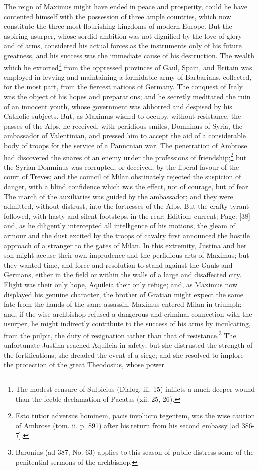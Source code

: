 The reign of Maximus might have ended in peace and prosperity, could he have contented himself with the possession of three ample countries, which now constitute the three most flourishing kingdoms of modern Europe. But the aspiring usurper, whose sordid ambition was not dignified by the love of glory and of arms, considered his actual forces as the instruments only of his future greatness, and his success was the immediate cause of his destruction. The wealth which he extorted\footnote{The modest censure of Sulpicius (Dialog. iii. 15) inflicts a much deeper wound than the feeble declamation of Pacatus (xii. 25, 26).} from the oppressed provinces of Gaul, Spain, and Britain was employed in levying and maintaining a formidable army of Barbarians, collected, for the most part, from the fiercest nations of Germany. The conquest of Italy was the object of his hopes and preparations; and he secretly meditated the ruin of an innocent youth, whose government was abhorred and despised by his Catholic subjects. But, as Maximus wished to occupy, without resistance, the passes of the Alps, he received, with perfidious smiles, Domninus of Syria, the ambassador of Valentinian, and pressed him to accept the aid of a considerable body of troops for the service of a Pannonian war. The penetration of Ambrose had discovered the snares of an enemy under the professions of friendship;\footnote{Esto tutior adversus hominem, pacis involucro tegentem, was the wise caution of Ambrose (tom. ii. p. 891) after his return from his second embassy [ad 386-7].} but the Syrian Domninus was corrupted, or deceived, by the liberal favour of the court of Treves; and the council of Milan obstinately rejected the suspicion of danger, with a blind confidence which was the effect, not of courage, but of fear. The march of the auxiliaries was guided by the ambassador; and they were admitted, without distrust, into the fortresses of the Alps. But the crafty tyrant followed, with hasty and silent footsteps, in the rear; Edition: current; Page: [38] and, as he diligently intercepted all intelligence of his motions, the gleam of armour and the dust excited by the troops of cavalry first announced the hostile approach of a stranger to the gates of Milan. In this extremity, Justina and her son might accuse their own imprudence and the perfidious arts of Maximus; but they wanted time, and force and resolution to stand against the Gauls and Germans, either in the field or within the walls of a large and disaffected city. Flight was their only hope, Aquileia their only refuge; and, as Maximus now displayed his genuine character, the brother of Gratian might expect the same fate from the hands of the same assassin. Maximus entered Milan in triumph; and, if the wise archbishop refused a dangerous and criminal connection with the usurper, he might indirectly contribute to the success of his arms by inculcating, from the pulpit, the duty of resignation rather than that of resistance.\footnote{Baronius (ad 387, No. 63) applies to this season of public distress some of the penitential sermons of the archbishop.} The unfortunate Justina reached Aquileia in safety; but she distrusted the strength of the fortifications; she dreaded the event of a siege; and she resolved to implore the protection of the great Theodosius, whose power 
